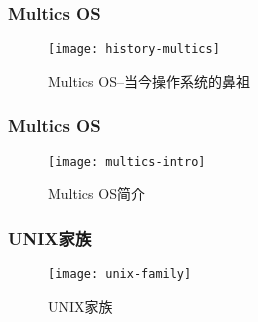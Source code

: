 \begin{frame}
    \frametitle{Multics OS}
    
    \begin{figure}
        \centering
        \texttt{[image: history-multics]}
        \caption{Multics OS--当今操作系统的鼻祖}
    \end{figure}
    
\end{frame}


\begin{frame}
    \frametitle{Multics OS}
    
    \begin{figure}
        \centering
        \texttt{[image: multics-intro]}
        \caption{Multics OS简介}
    \end{figure}
    
\end{frame}

\begin{frame}[plain]
    
    \frametitle{UNIX家族}
    
    \begin{figure}
        \centering
        \texttt{[image: unix-family]}
        \caption{UNIX家族}
    \end{figure}
    
\end{frame}

